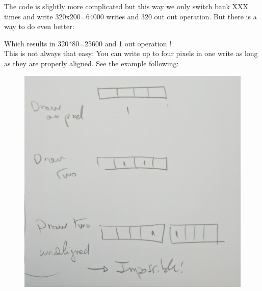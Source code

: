 

The code is slightly more complicated but this way we only switch bank XXX times and write 320x200=64000 writes and  320 out out operation. But there is a way to do even better: 



Which results in 320*80=25600 and 1 out operation !\\

This is not always that easy: You can write up to four pixels in one write as long as they are properly aligned. See the example following:
\begin{figure}[H]
  \centering
 \includegraphics[width=\textwidth]{imgs//vga_multiple_pixel_write.png}
\end{figure}





















  
  
